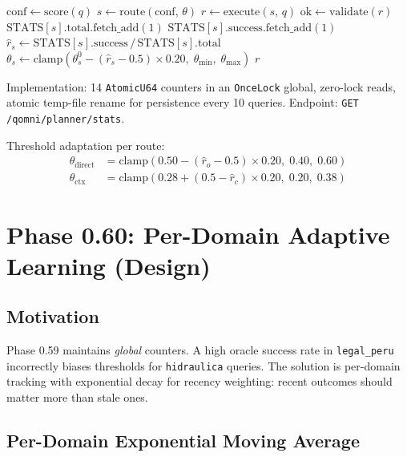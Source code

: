 \documentclass[12pt,a4paper]{article}
\begin{document}
\begin{algorithm}[h]
\caption{Phase 0.59 adaptive routing}
\begin{algorithmic}[1]
\State $\text{conf} \gets \text{score}(q)$
\State $s \gets \text{route}(\text{conf},\, \theta)$ 
\State $r \gets \text{execute}(s,\, q)$
\State $\text{ok} \gets \text{validate}(r)$
\State $\text{STATS}[s].\text{total}.\text{fetch\_add}(1)$
 \State $\text{STATS}[s].\text{success}.\text{fetch\_add}(1)$
\EndIf
{}
  \State $\hat{r}_s \gets \text{STATS}[s].\text{success} \,/\, \text{STATS}[s].\text{total}$
  \State $\theta_s \gets \text{clamp}(\theta_s^0 - (\hat{r}_s - 0.5) \times 0.20,\; \theta_{\min},\; \theta_{\max})$
\EndIf
\State \Return $r$
\end{algorithmic}
\end{algorithm}

Implementation: 14 \texttt{AtomicU64} counters in an \texttt{OnceLock} global,
zero-lock reads, atomic temp-file rename for persistence every 10 queries.
Endpoint: \texttt{GET /qomni/planner/stats}.

Threshold adaptation per route:
\begin{align}
\theta_{\text{direct}} &= \text{clamp}\!\left(0.50 - (\hat{r}_o - 0.5)\times 0.20,\; 0.40,\; 0.60\right) \\
\theta_{\text{ctx}} &= \text{clamp}\!\left(0.28 + (0.5 - \hat{r}_c)\times 0.20,\; 0.20,\; 0.38\right)
\end{align}

\section{Phase 0.60: Per-Domain Adaptive Learning (Design)}
\label{sec:p060}

\subsection{Motivation}

Phase 0.59 maintains \emph{global} counters. A high oracle success rate in
\texttt{legal\_peru} incorrectly biases thresholds for \texttt{hidraulica}
queries. The solution is per-domain tracking with exponential decay for
recency weighting: recent outcomes should matter more than stale ones.

\subsection{Per-Domain Exponential Moving Average}
\end{document}
